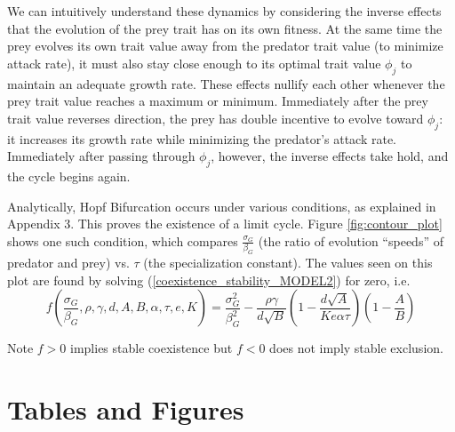 \documentclass{amsart}
\theoremstyle{definition}
\theoremstyle{remark}
\numberwithin{equation}{section}
\begin{document}
We can intuitively understand these dynamics by considering the inverse effects that the evolution of the prey trait has on its own fitness.  At the same time the prey evolves its own trait value away from the predator trait value (to minimize attack rate), it must also stay close enough to its optimal trait value $\phi_j$ to maintain an adequate growth rate.  These effects nullify each other whenever the prey trait value reaches a maximum or minimum.  Immediately after the prey trait value reverses direction, the prey has double incentive to evolve toward $\phi_j$: it increases its growth rate while minimizing the predator's attack rate.  Immediately after passing through $\phi_j$, however, the inverse effects take hold, and the cycle begins again.

Analytically, Hopf Bifurcation occurs under various conditions, as explained in Appendix 3.  This proves the existence of a limit cycle.  Figure \ref{fig:contour_plot} shows one such condition, which compares $\frac{\sigma_G}{\beta_G}$ (the ratio of evolution ``speeds'' of predator and prey) vs. $\tau$ (the specialization constant).  The values seen on this plot are found by solving (\ref{coexistence_stability_MODEL2}) for zero, i.e.
\begin{equation}
	f\left(\frac{\sigma_G}{\beta_G}, \rho, \gamma, d, A, B, \alpha, \tau, e, K\right) = \frac{\sigma_G^2}{\beta_G^2} - \frac{\rho\gamma}{d\sqrt{B}}\left(1 - \frac{d\sqrt{A}}{Ke\alpha\tau}\right)\left(1 - \frac{A}{B}\right)
\end{equation}

Note $f > 0$ implies stable coexistence but $f < 0$ does not imply stable exclusion.
































\FloatBarrier
\pagebreak
\section{Tables and Figures}
\end{document}

